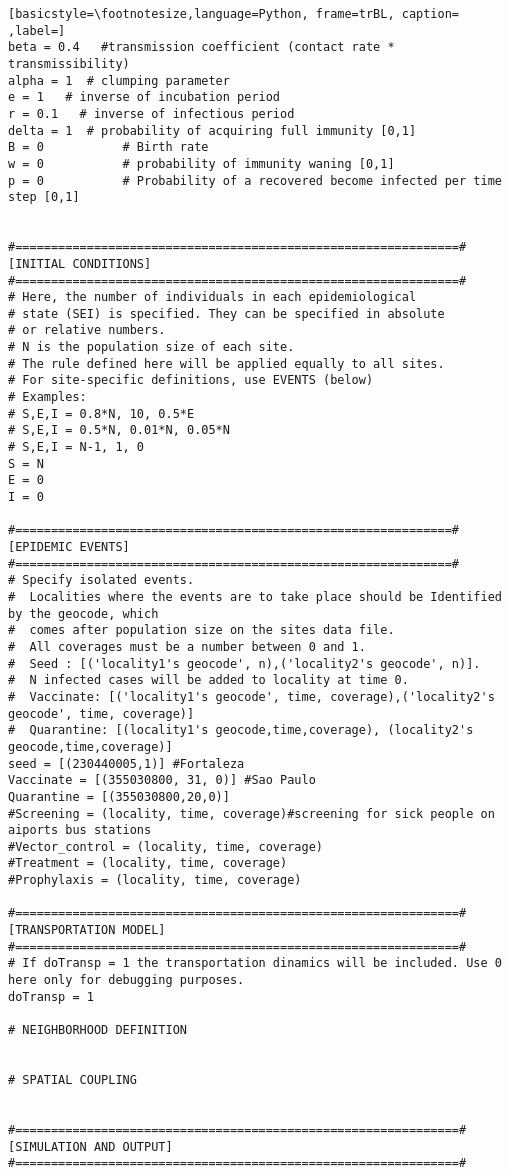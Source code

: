 \begin{lstlisting}[basicstyle=\footnotesize,language=Python, frame=trBL, caption= ,label=]
beta = 0.4   #transmission coefficient (contact rate * transmissibility)
alpha = 1  # clumping parameter
e = 1   # inverse of incubation period
r = 0.1   # inverse of infectious period
delta = 1  # probability of acquiring full immunity [0,1]
B = 0           # Birth rate
w = 0           # probability of immunity waning [0,1]
p = 0           # Probability of a recovered become infected per time step [0,1]


#==============================================================#
[INITIAL CONDITIONS]
#==============================================================#
# Here, the number of individuals in each epidemiological
# state (SEI) is specified. They can be specified in absolute
# or relative numbers.
# N is the population size of each site.
# The rule defined here will be applied equally to all sites.
# For site-specific definitions, use EVENTS (below)
# Examples:
# S,E,I = 0.8*N, 10, 0.5*E
# S,E,I = 0.5*N, 0.01*N, 0.05*N
# S,E,I = N-1, 1, 0
S = N
E = 0
I = 0

#=============================================================#
[EPIDEMIC EVENTS]
#=============================================================#
# Specify isolated events.
#  Localities where the events are to take place should be Identified by the geocode, which 
#  comes after population size on the sites data file.
#  All coverages must be a number between 0 and 1.
#  Seed : [('locality1's geocode', n),('locality2's geocode', n)]. 
#  N infected cases will be added to locality at time 0.
#  Vaccinate: [('locality1's geocode', time, coverage),('locality2's geocode', time, coverage)] 
#  Quarantine: [(locality1's geocode,time,coverage), (locality2's geocode,time,coverage)]
seed = [(230440005,1)] #Fortaleza
Vaccinate = [(355030800, 31, 0)] #Sao Paulo
Quarantine = [(355030800,20,0)]
#Screening = (locality, time, coverage)#screening for sick people on aiports bus stations
#Vector_control = (locality, time, coverage)
#Treatment = (locality, time, coverage)
#Prophylaxis = (locality, time, coverage)

#==============================================================#
[TRANSPORTATION MODEL]
#==============================================================#
# If doTransp = 1 the transportation dinamics will be included. Use 0 here only for debugging purposes.
doTransp = 1

# NEIGHBORHOOD DEFINITION


# SPATIAL COUPLING


#==============================================================#
[SIMULATION AND OUTPUT]
#==============================================================#


\end{lstlisting}
